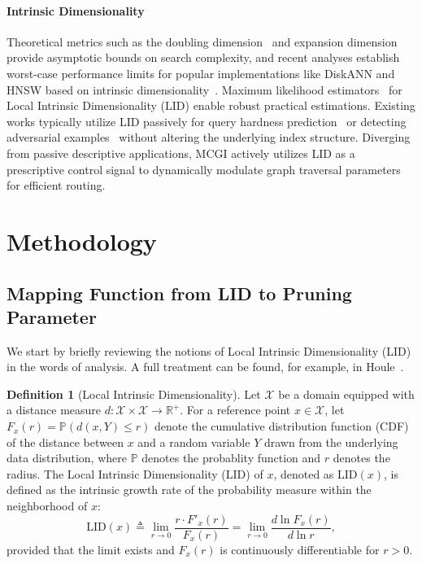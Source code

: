 \documentclass{article}
\theoremstyle{plain}
\theoremstyle{definition}
\newtheorem{definition}[theorem]{Definition}
\theoremstyle{remark}
\begin{document}
\paragraph{Intrinsic Dimensionality}
Theoretical metrics such as the doubling dimension~\cite{gupta2003bounded} and expansion dimension~\cite{karger2002finding} provide asymptotic bounds on search complexity, and recent analyses establish worst-case performance limits for popular implementations like DiskANN and HNSW based on intrinsic dimensionality~\cite{NEURIPS2023_d0ac28b7}. Maximum likelihood estimators~\cite{NIPS2004_74934548} for Local Intrinsic Dimensionality (LID) enable robust practical estimations. Existing works typically utilize LID passively for query hardness prediction~\cite{he2012difficulty, 10.14778/3704965.3704974} or detecting adversarial examples~\cite{ma2018characterizing} without altering the underlying index structure. Diverging from passive descriptive applications, MCGI actively utilizes LID as a prescriptive control signal to dynamically modulate graph traversal parameters for efficient routing.

\section{Methodology} 
\label{method}

\subsection{Mapping Function from LID to Pruning Parameter}
\label{subsec:mapping}

We start by briefly reviewing the notions of Local Intrinsic Dimensionality (LID) in the words of analysis. A full treatment can be found, for example, in Houle~\cite{DBLP:conf/sisap/Houle17}.

\begin{definition}[Local Intrinsic Dimensionality]
\label{def:lid}
    Let $\mathcal{X}$ be a domain equipped with a distance measure $d: \mathcal{X} \times \mathcal{X} \to \mathbb{R}^+$. For a reference point $x \in \mathcal{X}$, let $F_x(r) = \mathbb{P}(d(x, Y) \le r)$ denote the cumulative distribution function (CDF) of the distance between $x$ and a random variable $Y$ drawn from the underlying data distribution, where $\mathbb{P}$ denotes the probablity function and $r$ denotes the radius. 
    The Local Intrinsic Dimensionality (LID) of $x$, denoted as $\text{LID}(x)$, is defined as the intrinsic growth rate of the probability measure within the neighborhood of $x$:
    \begin{equation}\label{eq:pid}
        \text{LID}(x) \triangleq \lim_{r \to 0} \frac{r \cdot F'_x(r)}{F_x(r)} = \lim_{r \to 0} \frac{d \ln F_x(r)}{d \ln r},
    \end{equation}
    provided that the limit exists and $F_x(r)$ is continuously differentiable for $r > 0$.
\end{definition}
\end{document}
